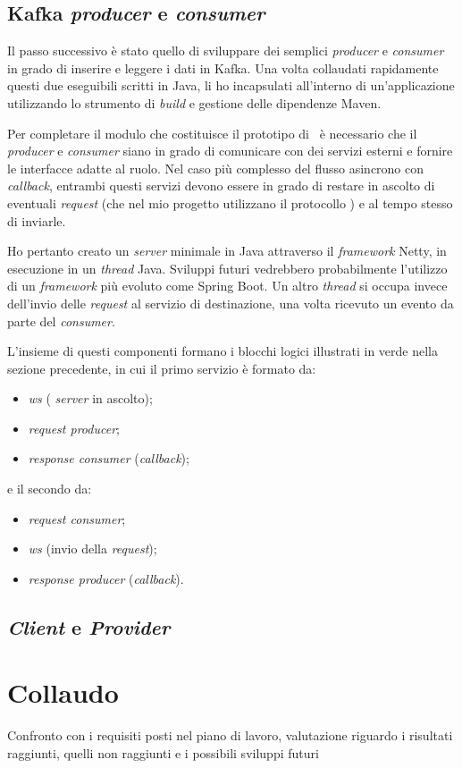 \subsection{Kafka \textit{producer} e \textit{consumer}}

Il passo successivo è stato quello di sviluppare dei semplici \textit{producer} e \textit{consumer} in grado di inserire e leggere i dati in Kafka.
Una volta collaudati rapidamente questi due eseguibili scritti in Java, li ho incapsulati all'interno di un'applicazione utilizzando lo strumento di \textit{build} e gestione delle dipendenze Maven.

Per completare il modulo che costituisce il prototipo di \middleware\ è necessario che il \textit{producer} e \textit{consumer} siano in grado di comunicare con dei servizi esterni e fornire le interfacce adatte al ruolo.
Nel caso più complesso del flusso asincrono con \textit{callback}, entrambi questi servizi devono essere in grado di restare in ascolto di eventuali  \textit{request} (che nel mio progetto utilizzano il protocollo ) e al tempo stesso di inviarle.

Ho pertanto creato un  \textit{server} minimale in Java attraverso il \textit{framework} Netty, in esecuzione in un \textit{thread} Java.
Sviluppi futuri vedrebbero probabilmente l'utilizzo di un \textit{framework} più evoluto come Spring Boot.
Un altro \textit{thread} si occupa invece dell'invio delle  \textit{request} al servizio di destinazione, una volta ricevuto un evento da parte del \textit{consumer}.

\bigskip\noindent
L'insieme di questi componenti formano i blocchi logici illustrati in verde nella sezione precedente, in cui il primo servizio è formato da:
\begin{itemize}
  \item {} \textit{\acrlong{ws}} ( \textit{server} in ascolto);
  \item \textit{request producer};
  \item \textit{response consumer} (\textit{callback});
\end{itemize}
\noindent
e il secondo da:
\begin{itemize}
  \item \textit{request consumer};
  \item {} \textit{\acrlong{ws}} (invio della \textit{request});
  \item \textit{response producer} (\textit{callback}).
\end{itemize}

\subsection{ \textit{Client} e  \textit{Provider} }



\section{Collaudo}

Confronto con i requisiti posti nel piano di lavoro, valutazione riguardo i risultati raggiunti, quelli non raggiunti e i possibili sviluppi futuri
